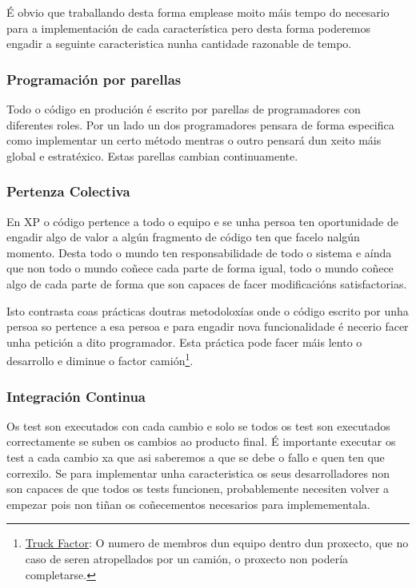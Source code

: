 É obvio que traballando desta forma emplease moito máis tempo do necesario para a implementación de cada característica pero desta forma poderemos engadir a seguinte caracteristica nunha cantidade razonable de tempo.

\subsubsection{Programación por parellas}
Todo o código en produción é escrito por parellas de programadores con diferentes roles. Por un lado un dos programadores pensara de forma especifica como implementar un certo método mentras o outro pensará dun xeito máis global e estratéxico. Estas parellas cambian continuamente.

\subsubsection{Pertenza Colectiva}
En XP o código pertence a todo o equipo e se unha persoa ten oportunidade de engadir algo de valor a algún fragmento de código ten que facelo nalgún momento. Desta todo o mundo ten responsabilidade de todo o sistema e aínda que non todo o mundo coñece cada parte de forma igual, todo o mundo coñece algo de cada parte de forma que son capaces de facer modificacións satisfactorias.

Isto contrasta coas prácticas doutras metodoloxías onde o código escrito por unha persoa so pertence a esa persoa e para engadir nova funcionalidade é necerio facer unha petición a dito programador. Esta práctica pode facer máis lento o desarrollo e diminue o factor camión\footnote{\href{http://en.wikipedia.org/wiki/Bus\_factor}{Truck Factor}: O numero de membros dun equipo dentro dun proxecto, que no caso de seren atropellados por un camión, o proxecto non podería completarse.}.

\subsubsection{Integración Continua}
Os test son executados con cada cambio e solo se todos os test son executados correctamente se suben os cambios ao producto final. É importante executar os test a cada cambio xa que asi saberemos a que se debe o fallo e quen ten que correxilo. Se para implementar unha caracteristica os seus desarrolladores non son capaces de que todos os tests funcionen, probablemente necesiten volver a empezar pois non tiñan os coñecementos necesarios para implemementala. 

